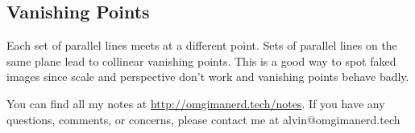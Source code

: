 \documentclass{math}
\begin{document}
\subsection*{Vanishing Points}
Each set of parallel lines meets at a different point. Sets of parallel lines on
the same plane lead to collinear vanishing points. This is a good way to spot
faked images since scale and perspective don't work and vanishing points behave
badly.

\begin{center}
  You can find all my notes at \url{http://omgimanerd.tech/notes}. If you have
  any questions, comments, or concerns, please contact me at
  alvin@omgimanerd.tech
\end{center}
\end{document}
